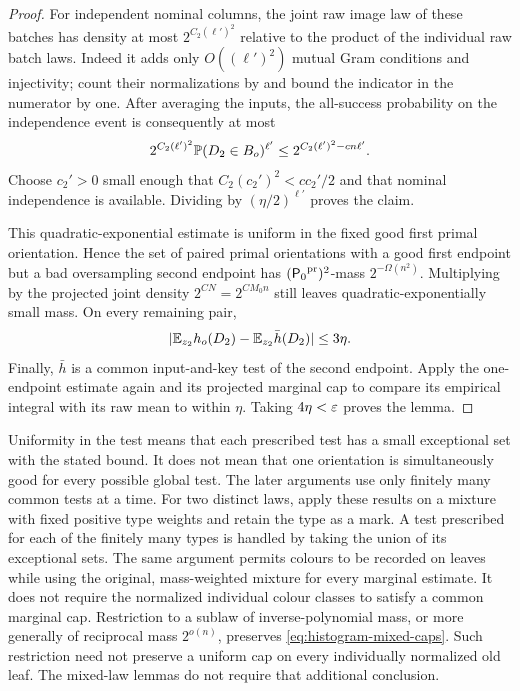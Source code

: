 \begin{proof}
For independent nominal columns, the joint raw image law of these
batches has density at most $2^{C_2(\ell')^2}$ relative to the product
of the individual raw batch laws. Indeed it adds only
$O((\ell')^2)$ mutual Gram conditions and injectivity; count their
normalizations by  and bound the
indicator in the numerator by one. After averaging the inputs, the
all-success probability on the independence event is consequently at
most
\[
 2^{C_2(\ell')^2}\mathbb P(D_2\in B_o)^{\ell'}
 \le2^{C_2(\ell')^2-cn\ell'}.
\]
Choose $c_2'>0$ small enough that $C_2(c_2')^2<cc_2'/2$ and that
nominal independence is available. Dividing by
$(\eta/2)^{\ell'}$ proves the claim.

This quadratic-exponential estimate is uniform in the fixed good
first primal orientation. Hence the set of paired primal orientations with a good
first endpoint but a bad oversampling second endpoint has
$({\mathsf P_0}^{\mathrm{pr}})^2$-mass $2^{-\Omega(n^2)}$. Multiplying by the projected joint density
$2^{CN}=2^{CM_0n}$ still leaves quadratic-exponentially small mass.
On every remaining pair,
\[
 \lvert \mathbb E_{z_2}h_o(D_2)-\mathbb E_{z_2}\bar h(D_2)\rvert\le3\eta.
\]
Finally, $\bar h$ is a common input-and-key test of the second
endpoint. Apply the one-endpoint estimate again and its projected marginal cap
to compare its empirical integral with its raw mean to within
$\eta$. Taking $4\eta<\varepsilon$ proves the lemma.
\end{proof}

\begin{remark}\label{rem:typicality-no-test-supremum}
Uniformity in the test means that each prescribed test has a small
exceptional set with the stated bound. It does not mean that one
orientation is simultaneously good for every possible global test.
The later arguments use only finitely many common tests at a time.
For two distinct laws, apply these results on a mixture with fixed
positive type weights and retain the type as a mark.  A test prescribed
for each of the finitely many types is handled by taking the union
of its exceptional sets.  The same argument permits colours to be
recorded on leaves while using the original, mass-weighted mixture
for every marginal estimate.  It does not require the normalized
individual colour classes to satisfy a common marginal cap.
Restriction to a sublaw of inverse-polynomial mass, or more generally
of reciprocal mass $2^{o(n)}$, preserves
\eqref{eq:histogram-mixed-caps}. Such restriction need not preserve a
uniform cap on every individually normalized old leaf. The mixed-law
lemmas do not require that additional conclusion.
\end{remark}


